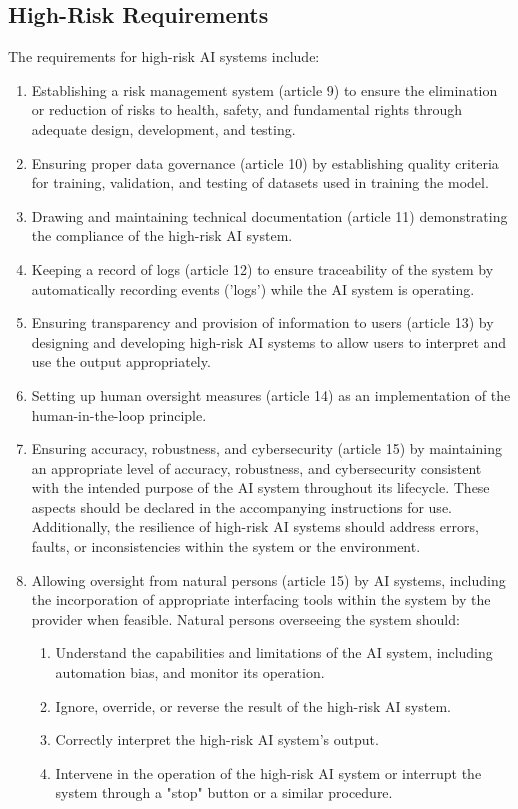 \subsection{High-Risk Requirements} \label{sec:High-risk-req}
The requirements for high-risk AI systems include:
\begin{enumerate}[label=(\alph*)]
    \item Establishing a risk management system (article 9) to ensure the elimination or reduction of risks to health, safety, and fundamental rights through adequate design, development, and testing.
    \item Ensuring proper data governance (article 10) by establishing quality criteria for training, validation, and testing of datasets used in training the model.
    \item Drawing and maintaining technical documentation (article 11) demonstrating the compliance of the high-risk AI system.
    \item Keeping a record of logs (article 12) to ensure traceability of the system by automatically recording events ('logs') while the AI system is operating.
    \item Ensuring transparency and provision of information to users (article 13) by designing and developing high-risk AI systems to allow users to interpret and use the output appropriately.
    \item Setting up human oversight measures (article 14) as an implementation of the human-in-the-loop principle.
    \item Ensuring accuracy, robustness, and cybersecurity (article 15) by maintaining an appropriate level of accuracy, robustness, and cybersecurity consistent with the intended purpose of the AI system throughout its lifecycle. These aspects should be declared in the accompanying instructions for use. Additionally, the resilience of high-risk AI systems should address errors, faults, or inconsistencies within the system or the environment.
    \item Allowing oversight from natural persons (article 15) by AI systems, including the incorporation of appropriate interfacing tools within the system by the provider when feasible. Natural persons overseeing the system should:
    \begin{enumerate}[label=(\roman*)]
        \item Understand the capabilities and limitations of the AI system, including automation bias, and monitor its operation.
        \item Ignore, override, or reverse the result of the high-risk AI system.
        \item Correctly interpret the high-risk AI system’s output.
        \item Intervene in the operation of the high-risk AI system or interrupt the system through a "stop" button or a similar procedure.
    \end{enumerate}
\end{enumerate}

